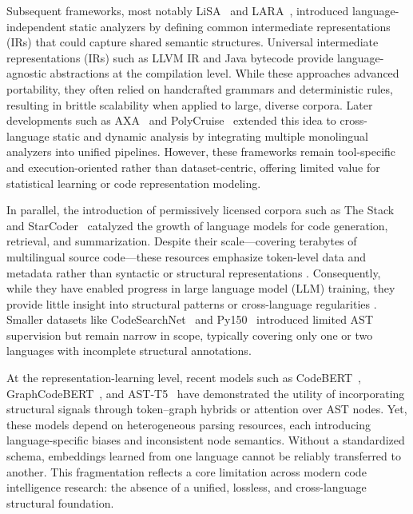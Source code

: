 \documentclass{article}
\begin{document}
Subsequent frameworks, most notably LiSA~\cite{negrini2023lisa} and LARA~\cite{bispo2021multi}, introduced language-independent static analyzers by defining common intermediate representations (IRs) that could capture shared semantic structures. Universal intermediate representations (IRs) such as LLVM IR\cite{LLVM} and Java bytecode\cite{javabyte} provide language-agnostic abstractions at the compilation level. While these approaches advanced portability, they often relied on handcrafted grammars and deterministic rules, resulting in brittle scalability when applied to large, diverse corpora. Later developments such as AXA~\cite{roth2024axa} and PolyCruise~\cite{li2022polycruise} extended this idea to cross-language static and dynamic analysis by integrating multiple monolingual analyzers into unified pipelines. However, these frameworks remain tool-specific and execution-oriented rather than dataset-centric, offering limited value for statistical learning or code representation modeling.

In parallel, the introduction of permissively licensed corpora such as The Stack~\cite{stack} and StarCoder~\cite{starcoder} catalyzed the growth of language models for code generation, retrieval, and summarization. Despite their scale—covering terabytes of multilingual source code—these resources emphasize token-level data and metadata rather than syntactic or structural representations \cite{heh2024}. Consequently, while they have enabled progress in large language model (LLM) training, they provide little insight into structural patterns or cross-language regularities \cite{maw2023}. Smaller datasets like CodeSearchNet~\cite{codesearch} and Py150~\cite{py150} introduced limited AST supervision but remain narrow in scope, typically covering only one or two languages with incomplete structural annotations.

At the representation-learning level, recent models such as CodeBERT~\cite{feng2020codebert}, GraphCodeBERT~\cite{guo2020graphcodebert}, and AST-T5~\cite{ASTT5} have demonstrated the utility of incorporating structural signals through token–graph hybrids or attention over AST nodes. Yet, these models depend on heterogeneous parsing resources, each introducing language-specific biases and inconsistent node semantics. Without a standardized schema, embeddings learned from one language cannot be reliably transferred to another. This fragmentation reflects a core limitation across modern code intelligence research: the absence of a unified, lossless, and cross-language structural foundation.
\end{document}

